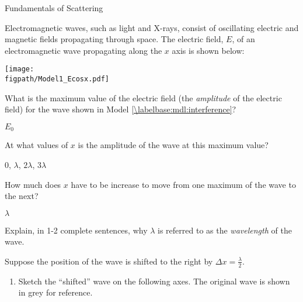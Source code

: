 \begin{activity}{Fundamentals of Scattering}
\begin{instructornotes}
\end{instructornotes}



\begin{model}
	\label{\labelbase:mdl:interference}
	
	Electromagnetic waves, such as light and X-rays, consist of oscillating electric and magnetic fields propagating through space.
	The electric field, $E$, of an electromagnetic wave propagating along the $x$ axis is shown below:
	
	\vspace{6pt}
	\centerline{\texttt{[image: \\figpath/Model1\_Ecosx.pdf]}}
	
\end{model}


\begin{ctqs}

	\question What is the maximum value of the electric field (the \emph{amplitude} of the electric field) for the wave shown in Model \ref{\labelbase:mdl:interference}?
	
		\begin{solution}[0.25in]
			$E_0$
		\end{solution}
	
	\question At what values of $x$ is the amplitude of the wave at this maximum value?
	
		\begin{solution}[0.25in]
			0, $\lambda$, $2\lambda$, $3\lambda$
		\end{solution}
	
	\question How much does $x$ have to be increase to move from one maximum of the wave to the next?
	
		\begin{solution}[0.25in]
			$\lambda$
		\end{solution}
	
	\question Explain, in 1-2 complete sentences, why $\lambda$ is referred to as the \emph{wavelength} of the wave.
	
		\begin{solution}[1.5in]
		\end{solution}
	
	\clearpage
	\question Suppose the position of the wave is shifted to the right by $\Delta x = \frac{\lambda}{2}$.
	
		\begin{enumerate}
			\item Sketch the ``shifted'' wave on the following axes.  The original wave is shown in grey for reference.
	

\end{enumerate}
\end{ctqs}
\end{activity}
